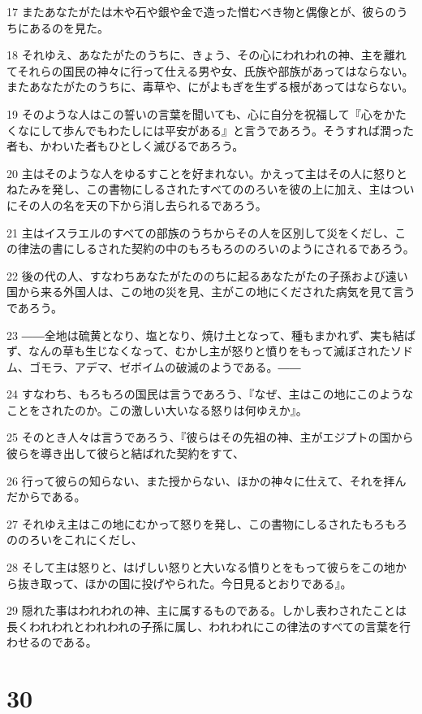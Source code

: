 \par 17 またあなたがたは木や石や銀や金で造った憎むべき物と偶像とが、彼らのうちにあるのを見た。
\par 18 それゆえ、あなたがたのうちに、きょう、その心にわれわれの神、主を離れてそれらの国民の神々に行って仕える男や女、氏族や部族があってはならない。またあなたがたのうちに、毒草や、にがよもぎを生ずる根があってはならない。
\par 19 そのような人はこの誓いの言葉を聞いても、心に自分を祝福して『心をかたくなにして歩んでもわたしには平安がある』と言うであろう。そうすれば潤った者も、かわいた者もひとしく滅びるであろう。
\par 20 主はそのような人をゆるすことを好まれない。かえって主はその人に怒りとねたみを発し、この書物にしるされたすべてののろいを彼の上に加え、主はついにその人の名を天の下から消し去られるであろう。
\par 21 主はイスラエルのすべての部族のうちからその人を区別して災をくだし、この律法の書にしるされた契約の中のもろもろののろいのようにされるであろう。
\par 22 後の代の人、すなわちあなたがたののちに起るあなたがたの子孫および遠い国から来る外国人は、この地の災を見、主がこの地にくだされた病気を見て言うであろう。
\par 23 ――全地は硫黄となり、塩となり、焼け土となって、種もまかれず、実も結ばず、なんの草も生じなくなって、むかし主が怒りと憤りをもって滅ぼされたソドム、ゴモラ、アデマ、ゼボイムの破滅のようである。――
\par 24 すなわち、もろもろの国民は言うであろう、『なぜ、主はこの地にこのようなことをされたのか。この激しい大いなる怒りは何ゆえか』。
\par 25 そのとき人々は言うであろう、『彼らはその先祖の神、主がエジプトの国から彼らを導き出して彼らと結ばれた契約をすて、
\par 26 行って彼らの知らない、また授からない、ほかの神々に仕えて、それを拝んだからである。
\par 27 それゆえ主はこの地にむかって怒りを発し、この書物にしるされたもろもろののろいをこれにくだし、
\par 28 そして主は怒りと、はげしい怒りと大いなる憤りとをもって彼らをこの地から抜き取って、ほかの国に投げやられた。今日見るとおりである』。
\par 29 隠れた事はわれわれの神、主に属するものである。しかし表わされたことは長くわれわれとわれわれの子孫に属し、われわれにこの律法のすべての言葉を行わせるのである。

\chapter{30}

